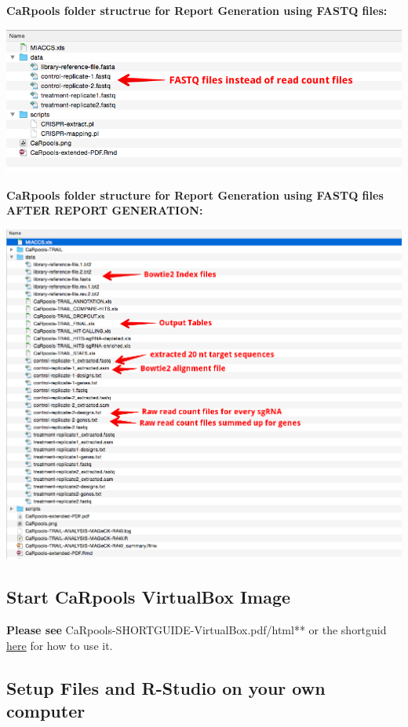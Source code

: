 \documentclass[]{article}
\begin{document}
\textbf{CaRpools folder structrue for Report Generation using FASTQ
files:}

\includegraphics{./pictures/folder-structure-FASTQ-before.png}

\textbf{CaRpools folder structure for Report Generation using FASTQ
files AFTER REPORT GENERATION:}

\includegraphics{./pictures/folder-structure-FASTQ-FINAL.png}

\newpage

\subsection{Start CaRpools VirtualBox
Image}\label{start-carpools-virtualbox-image}

\textbf{Please see }CaRpools-SHORTGUIDE-VirtualBox.pdf/html** or the
shortguid
\href{https://github.com/boutroslab/caRpools/blob/master/docs/CaRpools-SHORTGUIDE-VirtualBox.Rmd}{here}
for how to use it.

\subsection{Setup Files and R-Studio on your own
computer}\label{setup-files-and-r-studio-on-your-own-computer}
\end{document}
